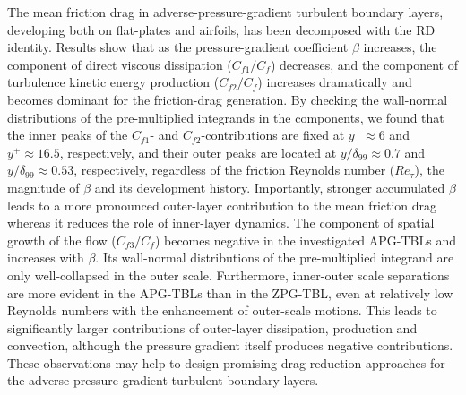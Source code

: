 The mean friction drag in adverse-pressure-gradient turbulent boundary layers, developing both on flat-plates and airfoils, has been decomposed with the RD identity\cite{Renard2016}. 
Results show that as the pressure-gradient coefficient $\beta$ increases, the component of direct viscous dissipation ($C_{f1}/C_f$) decreases, and the component of turbulence kinetic energy production ($C_{f2}/C_f$) increases dramatically and becomes dominant for the friction-drag generation. 
By checking the wall-normal distributions of the pre-multiplied integrands in the components, we found that the inner peaks of the $C_{f1}$- and $C_{f2}$-contributions are fixed at $y^+\approx6$ and $y^+\approx16.5$, respectively, and their outer peaks are located at $y/\delta_{99}\approx0.7$ and $y/\delta_{99}\approx0.53$, respectively, regardless of the friction Reynolds number ($Re_\tau$), the magnitude of $\beta$ and its development history. Importantly, stronger accumulated $\beta$ leads to a more pronounced outer-layer contribution to the mean friction drag whereas it reduces the role of inner-layer dynamics.
The component of spatial growth of the flow ($C_{f3}/C_f$) becomes negative in the investigated APG-TBLs and increases with $\beta$. 
Its wall-normal distributions of the pre-multiplied integrand are only well-collapsed in the outer scale.
Furthermore, inner-outer scale separations are more evident in the APG-TBLs than in the ZPG-TBL, even at relatively low Reynolds numbers with the enhancement of outer-scale motions. This leads to significantly larger contributions of outer-layer dissipation,  production and convection, although the pressure gradient itself produces negative contributions.
These observations may help to design promising drag-reduction approaches for the adverse-pressure-gradient turbulent boundary layers.



%

